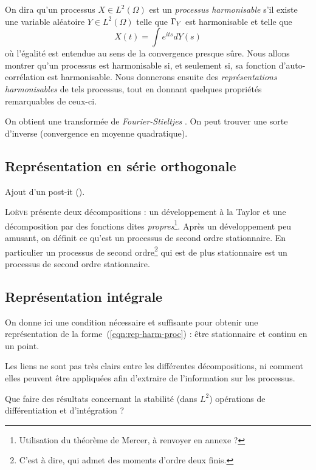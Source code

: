
On dira qu'un processus $X\in L^2(\Omega)$ est un \emph{processus
  harmonisable} s'il existe une variable aléatoire $Y\in L^2(\Omega)$
telle que $\Gamma_Y$ est harmonisable et telle que
\begin{equation}
  \label{eqn:rep-harm-proc}
  X(t) = \int e^{its} dY(s)
\end{equation}
où l'égalité est entendue au sens de la convergence presque sûre. Nous
allons montrer qu'un processus est harmonisable si, et seulement si,
sa fonction d'auto-corrélation est harmonisable. Nous donnerons
ensuite des \emph{représentations harmonisables} de tels processus,
tout en donnant quelques propriétés remarquables de ceux-ci.

\begin{alert}
  On obtient une \og transformée de \emph{Fourier-Stieltjes} \fg{}. On
  peut trouver une sorte d'inverse (convergence en moyenne
  quadratique).
\end{alert}

\subsection{Représentation en série orthogonale}

\begin{alert}
  Ajout d'un post-it (\cite[p.~143]{loeve1978}).
\end{alert}

\textsc{Loève} présente deux décompositions : un développement à la
Taylor et une décomposition par des fonctions dites
\emph{propres}\footnote{Utilisation du théorème de Mercer, à renvoyer
  en annexe ?}. Après un développement peu amusant, on définit ce
qu'est un processus de second ordre stationnaire. En particulier un
processus de second ordre\footnote{C'est à dire, qui admet des moments
  d'ordre deux finis.} qui est de plus stationnaire est un processus de
second ordre stationnaire.

\subsection{Représentation intégrale}
On donne ici une condition nécessaire et suffisante pour obtenir une
représentation de la forme~(\ref{eqn:rep-harm-proc}) : être
stationnaire et continu en un point.

\begin{alert}
  Les liens ne sont pas très clairs entre les différentes
  décompositions, ni comment elles peuvent être appliquées afin
  d'extraire de l'information sur les processus.
\end{alert}

\begin{question}
  Que faire des résultats concernant la stabilité (dans $L^2$)
  opérations de différentiation et d'intégration ?
\end{question}